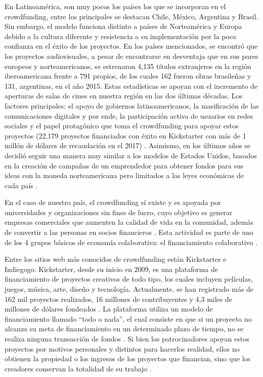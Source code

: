 En Latinoamérica, son muy pocos los países los que se incorporan en el crowdfunding, entre los principales se destacan Chile, México, Argentina y Brasil. Sin embargo, el modelo funciona distinto a países de Norteamérica y Europa debido a la cultura diferente y resistencia a su implementación por la poca confianza en el éxito de los proyectos. En los países mencionados, se encontró que los proyectos audiovisuales, a pesar de encontrarse en desventaja que en sus pares europeos y norteamericanos, se estrenaron 4,135 títulos extranjeros en la región iberoamericana frente a 791 propios, de los cuales 162 fueron obras brasileñas y 131, argentinas, en el año 2015. Estas estadísticas se apoyan con el incremento de aperturas de salas de cines en nuestra región en las dos últimas décadas. Los factores principales: el apoyo de gobiernos latinoamericanos, la masificación de las comunicaciones digitales y por ende, la participación activa de usuarios en redes sociales y el papel protagónico que toma el crowdfunding para apoyar estos proyectos (22,179 proyectos financiados con éxito en Kickstarter con más de 1 millón de dólares de recaudación en el 2017) \parencite{cr_lopezgolan2017crowdfunding}. Asimismo, en los últimos años se decidió seguir una manera muy similar a los modelos de Estados Unidos, basados en la creación de campañas de un emprendedor para obtener fondos para sus ideas con la moneda norteamericana pero limitados a las leyes económicas de cada país \parencite{cr_sl_crowdfundlatam}.


En el caso de nuestro país, el crowdfunding sí existe y es apoyada por universidades y organizaciones sin fines de lucro, cuyo objetivo es generar empresas comerciales que aumenten la calidad de vida en la comunidad, además de convertir a las personas en socios financieros \parencite{cr_fernandezbedoya2020colecoperu}. Esta actividad es parte de uno de los 4 grupos básicos de economía colaborativa: el financiamiento colaborativo \parencite{cr_stokes2014coleco}.

Entre los sitios web más conocidos de crowdfunding están Kickstarter e Indiegogo. Kickstarter, desde su inicio en 2009, es una plataforma de financiamiento de proyectos creativos de todo tipo, los cuales incluyen películas, juegos, música, arte, diseño y tecnología. Actualmente, se han registrado más de 162 mil proyectos realizados, 16 millones de contribuyentes y 4,3 miles de millones de dólares fondeados \parencite{cr_kickstarter_about}. La plataforma utiliza un modelo de financiamiento llamado “todo o nada”, el cual consiste en que si un proyecto no alcanza su meta de financiamiento en un determinado plazo de tiempo, no se realiza ninguna transacción de fondos \parencite{cr_kickstarter_founding}. Si bien los patrocinadores apoyan estos proyectos por motivos personales y distintos para hacerlos realidad, ellos no obtienen la propiedad o los ingresos de los proyectos que financian, sino que los creadores conservan la totalidad de su trabajo \parencite{cr_kickstarter_press}.

